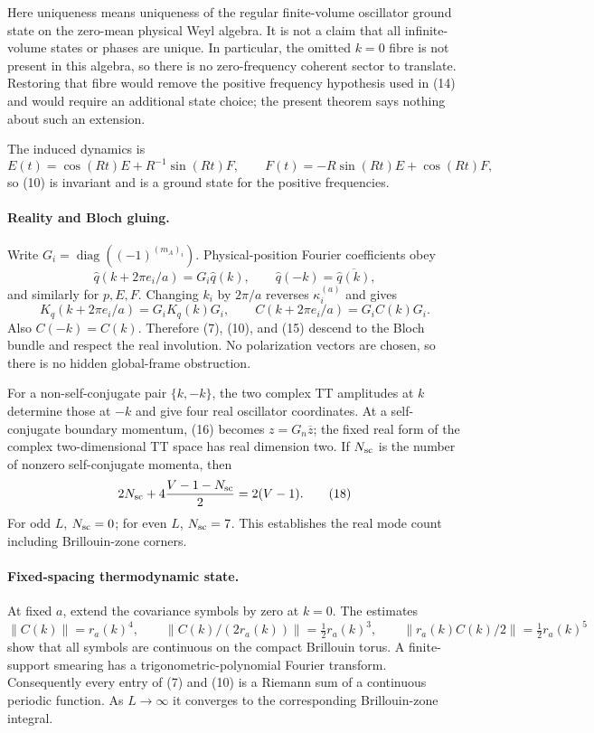 Here uniqueness means uniqueness of the regular finite-volume oscillator
ground state on the zero-mean physical Weyl algebra.  It is not a claim that
all infinite-volume states or phases are unique.  In particular, the omitted
$k=0$ fibre is not present in this algebra, so there is no zero-frequency
coherent sector to translate.  Restoring that fibre would remove the positive
frequency hypothesis used in (14) and would require an additional state
choice; the present theorem says nothing about such an extension.

The induced dynamics is
\[
 E(t)=\cos(Rt)E+R^{-1}\sin(Rt)F,\qquad
 F(t)=-R\sin(Rt)E+\cos(Rt)F,                       \tag{15}
\]
so (10) is invariant and is a ground state for the positive frequencies.

\paragraph{Reality and Bloch gluing.}

Write $G_i=\operatorname{diag}((-1)^{(m_A)_i})$.  Physical-position Fourier
coefficients obey
\[
 \widehat q(k+2\pi e_i/a)=G_i\widehat q(k),\qquad
 \widehat q(-k)=\overline{\widehat q(k)},           \tag{16}
\]
and similarly for $p,E,F$.  Changing $k_i$ by $2\pi/a$ reverses
$\kappa_i^{(a)}$ and gives
\[
 K_q(k+2\pi e_i/a)=G_iK_q(k)G_i,\qquad
 C(k+2\pi e_i/a)=G_iC(k)G_i.                       \tag{17}
\]
Also $C(-k)=C(k)$.  Therefore (7), (10), and (15) descend to the Bloch bundle
and respect the real involution.  No polarization vectors are chosen, so
there is no hidden global-frame obstruction.

For a non-self-conjugate pair $\{k,-k\}$, the two complex TT amplitudes at
$k$ determine those at $-k$ and give four real oscillator coordinates.  At a
self-conjugate boundary momentum, (16) becomes
$z=G_n\overline z$; the fixed real form of the complex two-dimensional TT
space has real dimension two.  If $N_{\rm sc}$ is the number of nonzero
self-conjugate momenta, then
\[
 2N_{\rm sc}+4\frac{V-1-N_{\rm sc}}2=2(V-1).       \tag{18}
\]
For odd $L$, $N_{\rm sc}=0$; for even $L$, $N_{\rm sc}=7$.  This establishes
the real mode count including Brillouin-zone corners.

\paragraph{Fixed-spacing thermodynamic state.}

At fixed $a$, extend the covariance symbols by zero at $k=0$.  The estimates
\[
 \|C(k)\|=r_a(k)^4,\qquad
 \|C(k)/(2r_a(k))\|=\tfrac12r_a(k)^3,\qquad
 \|r_a(k)C(k)/2\|=\tfrac12r_a(k)^5               \tag{19}
\]
show that all symbols are continuous on the compact Brillouin torus.  A
finite-support smearing has a trigonometric-polynomial Fourier transform.
Consequently every entry of (7) and (10) is a Riemann sum of a continuous
periodic function.  As $L\to\infty$ it converges to the corresponding
Brillouin-zone integral.


